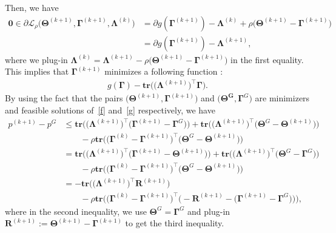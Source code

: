 \documentclass[alpha-refs]{wiley-article}
\begin{document}
Then, we have
\begin{align*}
    \boldsymbol{0} \in
    \partial\mathcal{L}_{\rho}\big(\boldsymbol{\Theta}^{(k+1)},\boldsymbol{\Gamma}^{(k+1)},\boldsymbol{\Lambda}^{(k)} \big)
    &= \partial g(\boldsymbol{\Gamma}^{(k+1)}) - \boldsymbol{\Lambda}^{(k)} + \rho\big( \boldsymbol{\Theta}^{(k+1)} - \boldsymbol{\Gamma}^{(k+1)} \big) \\
    &= \partial g(\boldsymbol{\Gamma}^{(k+1)}) - \boldsymbol{\Lambda}^{(k+1)},
\end{align*}
where we plug-in $\boldsymbol{\Lambda}^{(k)}=\boldsymbol{\Lambda}^{(k+1)}-\rho\big( \boldsymbol{\Theta}^{(k+1)} - \boldsymbol{\Gamma}^{(k+1)} \big)$ in the first equality.
This implies that $\boldsymbol{\Gamma}^{(k+1)}$ minimizes a following function :
\begin{align} \label{g}
    g(\boldsymbol{\Gamma}) - \textbf{tr} \big( \big( \boldsymbol{\Lambda}^{(k+1)}\big)^{\top} \boldsymbol{\Gamma} \big).
\end{align}
By using the fact that the pairs $\big( \boldsymbol{\Theta}^{(k+1)}, \boldsymbol{\Gamma}^{(k+1)} \big)$ and $\big( \boldsymbol{\Theta^{G}}, \boldsymbol{\Gamma}^{G} \big)$ are minimizers and feasible solutions of~\eqref{f} and~\eqref{g} respectively, we have
\begin{align}
    p^{(k+1)}-p^{G}
    &\leq \textbf{tr} \big( \big( \boldsymbol{\Lambda}^{(k+1)}\big)^{\top} \big( \boldsymbol{\Gamma}^{(k+1)} - \boldsymbol{\Gamma}^{G} \big) \big) + \textbf{tr} \big( \big( \boldsymbol{\Lambda}^{(k+1)}\big)^{\top} \big( \boldsymbol{\Theta}^{G} - \boldsymbol{\Theta}^{(k+1)}  \big) \big) \nonumber \\
    & \qquad - \rho \textbf{tr} \big( \big( \boldsymbol{\Gamma}^{(k)} - \boldsymbol{\Gamma}^{(k+1)} \big)^{\top} \big( \boldsymbol{\Theta}^{G} - \boldsymbol{\Theta}^{(k+1)} \big) \big) \nonumber \\
    &= \textbf{tr} \big( \big( \boldsymbol{\Lambda}^{(k+1)}\big)^{\top} \big( \boldsymbol{\Gamma}^{(k+1)} - \boldsymbol{\Theta}^{(k+1)} \big) \big) + \textbf{tr} \big( \big( \boldsymbol{\Lambda}^{(k+1)}\big)^{\top} \big( \boldsymbol{\Theta}^{G} - \boldsymbol{\Gamma}^{G}  \big) \big) \nonumber \\
    & \qquad - \rho \textbf{tr} \big( \big( \boldsymbol{\Gamma}^{(k)} - \boldsymbol{\Gamma}^{(k+1)} \big)^{\top} \big( \boldsymbol{\Theta}^{G} - \boldsymbol{\Theta}^{(k+1)} \big) \big) \nonumber \\
    &= - \textbf{tr} \big( \big( \boldsymbol{\Lambda}^{(k+1)}\big)^{\top} \boldsymbol{R}^{(k+1)} \big) \nonumber \\
    & \qquad - \rho \textbf{tr} \big( \big( \boldsymbol{\Gamma}^{(k)} - \boldsymbol{\Gamma}^{(k+1)} \big)^{\top} \big( - \boldsymbol{R}^{(k+1)} - \big( \boldsymbol{\Gamma}^{(k+1)} - \boldsymbol{\Gamma}^{G} \big) \big) \big),  \label{Ineq1}
\end{align}
where in the second inequality, we use $\boldsymbol{\Theta}^{G} = \boldsymbol{\Gamma}^{G}$ and plug-in $\boldsymbol{R}^{(k+1)} := \boldsymbol{\Theta}^{(k+1)}-\boldsymbol{\Gamma}^{(k+1)}$ to get the third inequality.
\end{document}
